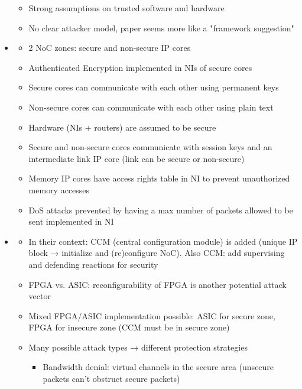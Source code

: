 \documentclass[
	paper=a4,
	fontsize=11pt,
	parskip=full %
]{scrreprt}
\begin{document}
\begin{itemize}
\begin{itemize}
                \item Strong assumptions on trusted software and hardware
                \item No clear attacker model, paper seems more like a "framework suggestion"
            \end{itemize}
        \item \textbf{}
            \begin{itemize}
                \item 2 NoC zones: secure and non-secure IP cores
                \item Authenticated Encryption implemented in NIs of secure cores
                \item Secure cores can communicate with each other using permanent keys
                \item Non-secure cores can communicate with each other using plain text
                \item Hardware (NIs + routers) are assumed to be secure
                \item Secure and non-secure cores communicate with session keys and an intermediate link IP core (link can be secure or non-secure)
                \item Memory IP cores have access rights table in NI to prevent unauthorized memory accesses
                \item DoS attacks prevented by having a max number of packets allowed to be sent implemented in NI
            \end{itemize}
        \item \textbf{}
            \begin{itemize}
                \item In their context: CCM (central configuration module) is added (unique IP block → initialize and (re)configure NoC). Also CCM:
                    add supervising and defending reactions for security
                \item FPGA vs. ASIC: reconfigurability of FPGA is another potential attack vector
                \item Mixed FPGA/ASIC implementation possible: ASIC for secure zone, FPGA for insecure zone (CCM must be in secure zone)
                \item Many possible attack types → different protection strategies
                    \begin{itemize}
                        \item Bandwidth denial: virtual channels in the secure area (unsecure packets can't obstruct secure packets)

\end{itemize}
\end{itemize}
\end{itemize}
\end{document}
